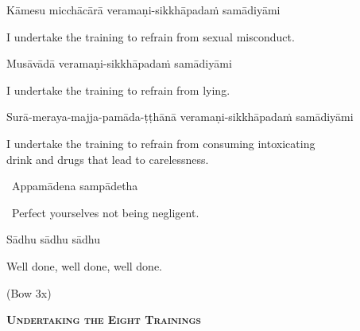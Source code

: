 Kāmesu micchācārā veramaṇi-sikkhāpadaṁ samādiyāmi

\begin{english}
  I undertake the training to refrain from sexual misconduct.
\end{english}

Musāvādā veramaṇi-sikkhāpadaṁ samādiyāmi

\begin{english}
  I undertake the training to refrain from lying.
\end{english}

\begin{pali-hang}
  Surā-meraya-majja-pamāda-ṭṭhānā veramaṇi-sikkhāpadaṁ samādiyāmi
\end{pali-hang}

\begin{english-hang}
  I undertake the training to refrain from consuming intoxicating\\
  drink and drugs that lead to carelessness.\ifdigitalversion\makeatletter\hyperlink{endnote140-appendix}\makeatother\fi
\end{english-hang}


\begin{pali-leader}
  \anglebracketleft\ \hspace{-0.5mm}Appamādena sampādetha \hspace{-0.5mm}\anglebracketright\
\end{pali-leader}

\begin{leader-english}
  \anglebracketleft\ \hspace{-0.5mm}Perfect yourselves not being negligent. \hspace{-0.5mm}\anglebracketright\
\end{leader-english}

Sādhu sādhu sādhu

\begin{english}
  Well done, well done, well done.
\end{english}

\begin{center}
  (Bow 3x)
\end{center}

\clearpage



\begin{center}
  \textbf{\textsc{Undertaking the Eight Trainings}}
\end{center}

